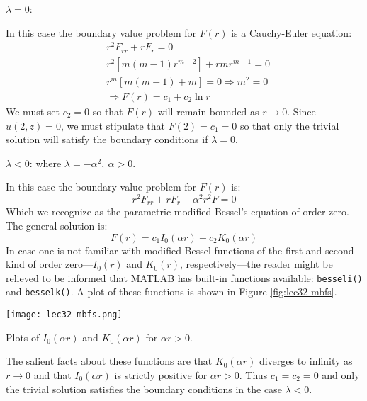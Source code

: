 \vspace{0.15cm}

\noindent\underline{$\lambda = 0$}:

\vspace{0.05cm}

\noindent In this case the boundary value problem for $F(r)$ is a Cauchy-Euler equation:
\begin{align*}
&r^2F_{rr} + rF_r = 0 \\
&r^2[m(m-1)r^{m-2}] + rmr^{m-1} = 0 \\
&r^m[m(m-1) + m] = 0 \Rightarrow m^2 = 0\\
&\Rightarrow F(r) = c_1 + c_2 \ln r
\end{align*}
We must set $c_2=0$ so that $F(r)$ will remain bounded as $r \to 0$.  Since $u(2,z)=0$, we must stipulate that $F(2)=c_1=0$ so that only the trivial solution will satisfy the boundary conditions if $\lambda = 0$.

\vspace{0.05cm}

\noindent\underline{$\lambda < 0$}: where $\lambda = -\alpha^2, \ \alpha>0$.

\noindent In this case the boundary value problem for $F(r)$ is:
\begin{equation*}
r^2F_{rr} + rF_r -\alpha^2r^2F = 0
\end{equation*} 
Which we recognize as the parametric modified Bessel's equation of order zero.  The general solution is:
\begin{equation*}
F(r) = c_1I_0(\alpha r) + c_2 K_0(\alpha r)
\end{equation*}
In case one is not familiar with modified Bessel functions of the first and second kind of order zero---$I_0(r)$ and $K_0(r)$, respectively---the reader might be relieved to be informed that MATLAB has built-in functions available: \lstinline[style=myMatlab]{besseli()} and \lstinline[style=myMatlab]{besselk()}. A plot of these functions is shown in Figure \ref{fig:lec32-mbfs}.
\begin{marginfigure}
\texttt{[image: lec32-mbfs.png]}
\caption{Plots of $I_0(\alpha r)$ and $K_0(\alpha r)$ for $\alpha r > 0$.}
\label{fig:lec32-mbfs}
\end{marginfigure}
The salient facts about these functions are that $K_0(\alpha r)$ diverges to infinity as $r \to 0$ and that $I_0(\alpha r)$ is strictly positive for $\alpha r > 0$.  Thus $c_1 = c_2 = 0$ and only the trivial solution satisfies the boundary conditions in the case $\lambda < 0 $.

